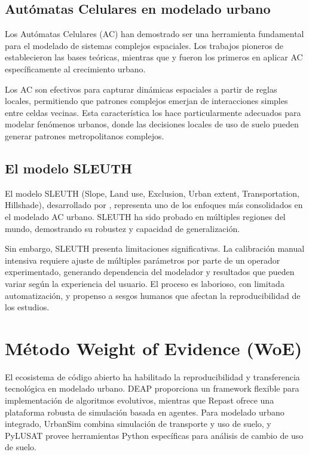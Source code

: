\subsection{Autómatas Celulares en modelado urbano}

Los Autómatas Celulares (AC) han demostrado ser una herramienta fundamental para el modelado de sistemas complejos espaciales. Los trabajos pioneros de \textcite{Wolfram1984} establecieron las bases teóricas, mientras que \textcite{Clarke1998} y \textcite{White1997} fueron los primeros en aplicar AC específicamente al crecimiento urbano.

Los AC son efectivos para capturar dinámicas espaciales a partir de reglas locales, permitiendo que patrones complejos emerjan de interacciones simples entre celdas vecinas. Esta característica los hace particularmente adecuados para modelar fenómenos urbanos, donde las decisiones locales de uso de suelo pueden generar patrones metropolitanos complejos.

\subsection{El modelo SLEUTH}

El modelo SLEUTH (Slope, Land use, Exclusion, Urban extent, Transportation, Hillshade), desarrollado por \textcite{Clarke2007}, representa uno de los enfoques más consolidados en el modelado AC urbano. SLEUTH ha sido probado en múltiples regiones del mundo, demostrando su robustez y capacidad de generalización.

Sin embargo, SLEUTH presenta limitaciones significativas. La calibración manual intensiva requiere ajuste de múltiples parámetros por parte de un operador experimentado, generando dependencia del modelador y resultados que pueden variar según la experiencia del usuario. El proceso es laborioso, con limitada automatización, y propenso a sesgos humanos que afectan la reproducibilidad de los estudios.

\section{Método Weight of Evidence (WoE)}

El ecosistema de código abierto ha habilitado la reproducibilidad y transferencia tecnológica en modelado urbano. DEAP \parencite{Fortin2024} proporciona un framework flexible para implementación de algoritmos evolutivos, mientras que Repast \parencite{North2023} ofrece una plataforma robusta de simulación basada en agentes. Para modelado urbano integrado, UrbanSim \parencite{Waddell2002} combina simulación de transporte y uso de suelo, y PyLUSAT \parencite{Chen2022} provee herramientas Python específicas para análisis de cambio de uso de suelo.

